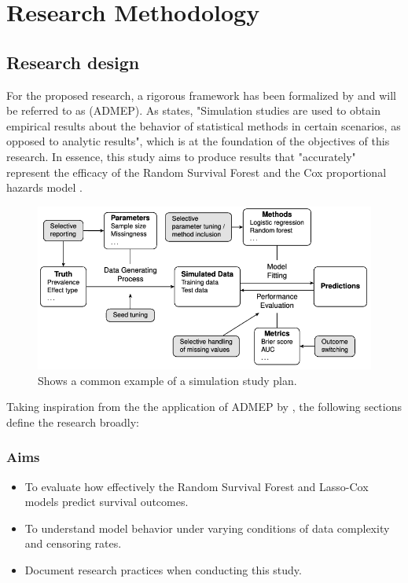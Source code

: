 \chapter{Research Methodology}
\label{Chapter2} %

\section{Research design} \label{design}
For the proposed research, a rigorous framework has been formalized by \parencite{morris_using_2019} and will be referred to as (ADMEP). As \parencite{morris_using_2019} states, "Simulation studies are used to obtain empirical results about the behavior of statistical methods in certain scenarios, as opposed to analytic results", which is at the foundation of the objectives of this research. In essence, this study aims to produce results that "accurately" represent the efficacy of the Random Survival Forest \parencite{ishwaran_random_2008} and the Cox proportional hazards model \parencite{cox_regression_1972}. 

\begin{figure}[h]
 \centering
 \includegraphics[scale=0.48]{Figures/METHOD_GRAPH.png}
 \caption{\parencite{pawel_pitfalls_2024} Shows a common example of a simulation study plan.}
\end{figure}

\noindent Taking inspiration from the the application of ADMEP by \parencite{pawel_pitfalls_2024}, the following sections define the research broadly:

\subsection{Aims}
\begin{itemize} 
\item To evaluate how effectively the Random Survival Forest and Lasso-Cox models predict survival outcomes.
\item To understand model behavior under varying conditions of data complexity and censoring rates.
\item Document research practices when conducting this study.
\end{itemize}

